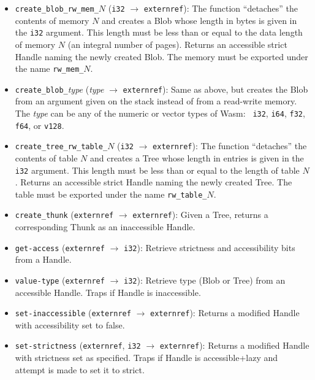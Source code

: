 \documentclass{article}
\newcommand{\blob}{\textrm{Blob}\xspace}
\newcommand{\thunk}{\textrm{Thunk}\xspace}
\newcommand{\tree}{\textrm{Tree}\xspace}
\newcommand{\handle}{\textrm{Handle}\xspace}
\begin{document}
\begin{itemize}
\item \texttt{create\_blob\_rw\_mem\_}$N$ (\texttt{i32} $\rightarrow$
  \texttt{externref}): The function ``detaches'' the contents of
  memory $N$ and creates a \blob whose length in bytes is given in
  the \texttt{i32} argument. This length must be less than or equal to
  the data length of memory $N$ (an integral number of pages). Returns
  an accessible strict \handle naming the newly created \blob. The
  memory must be exported under the name \texttt{rw\_mem\_}$N$.

\item \texttt{create\_blob\_}\emph{type} (\emph{type} $\rightarrow$
  \texttt{externref}): Same as above, but creates the \blob from an
  argument given on the stack instead of from a read-write memory. The
  \emph{type} can be any of the numeric or vector types of Wasm: {\tt
    i32}, {\tt i64}, {\tt f32}, {\tt f64}, or {\tt v128}.

\item \texttt{create\_tree\_rw\_table\_}$N$ (\texttt{i32}
  $\rightarrow$ \texttt{externref}): The function ``detaches'' the
  contents of table $N$ and creates a \tree whose length in entries is
  given in the \texttt{i32} argument. This length must be less than or
  equal to the length of table $N$. Returns an accessible strict \handle
  naming the newly created \tree. The table must be exported under the
  name \texttt{rw\_table\_}$N$.

\item \texttt{create\_thunk} (\texttt{externref} $\rightarrow$
  \texttt{externref}): Given a \tree, returns a corresponding \thunk as an inaccessible \handle.

\item \texttt{get-access} (\texttt{externref} $\rightarrow$ \texttt{i32}): Retrieve strictness and accessibility bits from a \handle.

\item \texttt{value-type} (\texttt{externref} $\rightarrow$ \texttt{i32}): Retrieve type (\blob or \tree) from an accessible \handle. Traps if \handle is inaccessible.

\item \texttt{set-inaccessible} (\texttt{externref} $\rightarrow$ \texttt{externref}): Returns a modified \handle with accessibility set to false.
  
\item \texttt{set-strictness} (\texttt{externref}, \texttt{i32} $\rightarrow$ \texttt{externref}): Returns a modified \handle with strictness set as specified. Traps if \handle is accessible+lazy and attempt is made to set
  it to strict.


\end{itemize}
\end{document}
